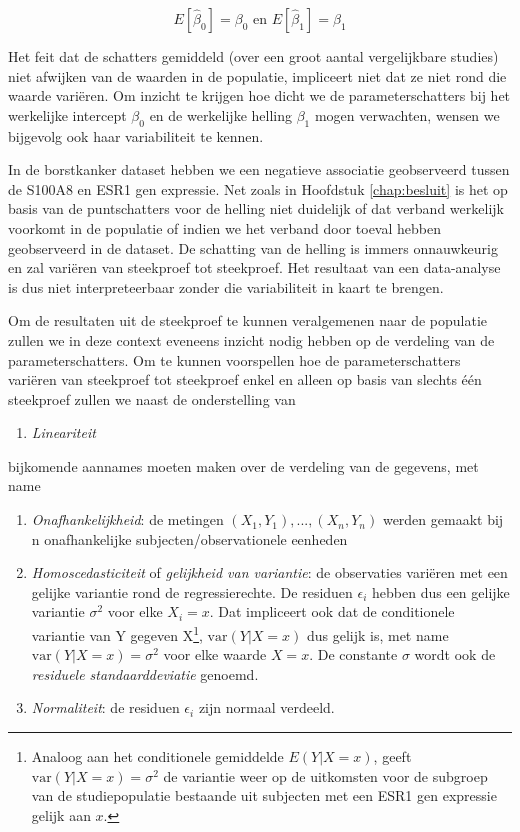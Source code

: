 \documentclass[
  12pt,dutch,coursenotes]{book}
\providecommand{\tightlist}{%
  \setlength{\itemsep}{0pt}\setlength{\parskip}{0pt}}
\theoremstyle{definition}
\theoremstyle{definition}
\theoremstyle{definition}
\theoremstyle{remark}
\begin{document}
\[E[\hat \beta_0]=\beta_0 \text{ en } E[\hat \beta_1]=\beta_1\]

Het feit dat de schatters gemiddeld (over een groot aantal vergelijkbare studies) niet afwijken van de waarden in de populatie, impliceert niet dat ze niet rond die waarde variëren.
Om inzicht te krijgen hoe dicht we de parameterschatters bij het werkelijke intercept \(\beta_0\) en de werkelijke helling \(\beta_1\) mogen verwachten, wensen we bijgevolg ook haar variabiliteit te kennen.

In de borstkanker dataset hebben we een negatieve associatie geobserveerd tussen de S100A8 en ESR1 gen expressie.
Net zoals in Hoofdstuk \ref{chap:besluit} is het op basis van de puntschatters voor de helling niet duidelijk of dat verband werkelijk voorkomt in de populatie of indien we het verband door toeval hebben geobserveerd in de dataset.
De schatting van de helling is immers onnauwkeurig en zal variëren van steekproef tot steekproef.
Het resultaat van een data-analyse is dus niet interpreteerbaar zonder die variabiliteit in kaart te brengen.

Om de resultaten uit de steekproef te kunnen veralgemenen naar de populatie zullen we in deze context eveneens inzicht nodig hebben op de verdeling van de parameterschatters.
Om te kunnen voorspellen hoe de parameterschatters variëren van steekproef tot steekproef enkel en alleen op basis van slechts één steekproef zullen we naast de onderstelling van

\begin{enumerate}
\def\labelenumi{\arabic{enumi}.}
\tightlist
\item
  \emph{Lineariteit}
\end{enumerate}

bijkomende aannames moeten maken over de verdeling van de gegevens, met name

\begin{enumerate}
\def\labelenumi{\arabic{enumi}.}
\setcounter{enumi}{1}
\tightlist
\item
  \emph{Onafhankelijkheid}: de metingen \((X_1,Y_1), ..., (X_n,Y_n)\) werden gemaakt bij n onafhankelijke subjecten/observationele eenheden
\item
  \emph{Homoscedasticiteit} of \emph{gelijkheid van variantie}: de observaties variëren met een gelijke variantie rond de regressierechte. De residuen \(\epsilon_i\) hebben dus een gelijke variantie \(\sigma^2\) voor elke \(X_i=x\). Dat impliceert ook dat de conditionele variantie van Y gegeven X\footnote{Analoog aan het conditionele
    gemiddelde \(E(Y|X=x)\), geeft \(\text{var}(Y\vert X=x) = \sigma^2\) de variantie weer op de uitkomsten voor de subgroep van de studiepopulatie bestaande uit subjecten met een ESR1 gen expressie gelijk aan \(x\).}, \(\text{var}(Y\vert X=x)\) dus gelijk is, met name \(\text{var}(Y\vert X=x) = \sigma^2\) voor elke waarde \(X=x\). De constante \(\sigma\) wordt ook de \emph{residuele standaarddeviatie} genoemd.
\item
  \emph{Normaliteit}: de residuen \(\epsilon_i\) zijn normaal verdeeld.
\end{enumerate}
\end{document}
